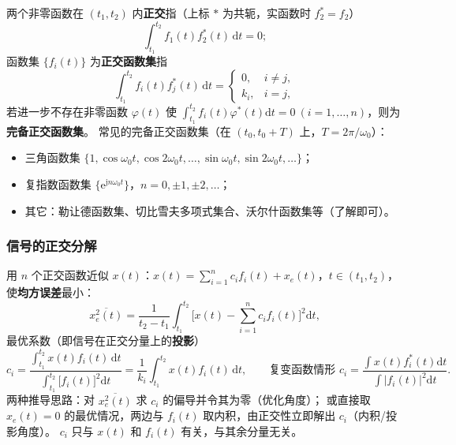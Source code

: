 两个非零函数在 $(t_1,t_2)$ 内\textbf{正交}指（上标 $*$ 为共轭，实函数时 $f_2^*=f_2$）
\begin{equation}
\int_{t_1}^{t_2}f_1(t)f_2^{*}(t)\,\mathrm{d}t=0;
\end{equation}
函数集 $\{f_i(t)\}$ 为\textbf{正交函数集}指
\begin{equation}
\int_{t_1}^{t_2}f_i(t)f_j^{*}(t)\,\mathrm{d}t=
\begin{cases}
0, & i\neq j,\\
k_i, & i=j,
\end{cases}
\end{equation}
若进一步不存在非零函数 $\varphi(t)$ 使
$\displaystyle\int_{t_1}^{t_2}f_i(t)\varphi^{*}(t)\mathrm{d}t=0\ (i=1,\dots,n)$，则为\textbf{完备正交函数集}。
常见的完备正交函数集（在 $(t_0,t_0+T)$ 上，$T=2\pi/\omega_0$）：
\begin{itemize}
\item 三角函数集 $\big\{1,\cos\omega_0t,\cos2\omega_0t,\dots,\sin\omega_0t,\sin2\omega_0t,\dots\big\}$；
\item 复指数函数集 $\big\{\mathrm{e}^{\mathrm{j}n\omega_0t}\big\}$，$n=0,\pm1,\pm2,\dots$；
\item 其它：勒让德函数集、切比雪夫多项式集合、沃尔什函数集等（了解即可）。
\end{itemize}

\subsubsection{信号的正交分解}

用 $n$ 个正交函数近似 $x(t)$：$x(t)=\sum_{i=1}^{n}c_if_i(t)+x_e(t)$，$t\in(t_1,t_2)$，
使\textbf{均方误差}最小：
\begin{equation}
\overline{x_e^2(t)}=\frac{1}{t_2-t_1}\int_{t_1}^{t_2}
\Big[x(t)-\sum_{i=1}^{n}c_if_i(t)\Big]^2\mathrm{d}t,
\end{equation}
最优系数（即信号在正交分量上的\textbf{投影}）
\begin{equation}
c_i=\frac{\displaystyle\int_{t_1}^{t_2}x(t)f_i(t)\,\mathrm{d}t}
{\displaystyle\int_{t_1}^{t_2}\big[f_i(t)\big]^2\mathrm{d}t}
=\frac{1}{k_i}\int_{t_1}^{t_2}x(t)f_i(t)\,\mathrm{d}t,
\qquad
\text{复变函数情形 }c_i=\frac{\int x(t)f_i^{*}(t)\mathrm{d}t}{\int\big|f_i(t)\big|^2\mathrm{d}t}.
\end{equation}
两种推导思路：对 $\overline{x_e^2(t)}$ 求 $c_i$ 的偏导并令其为零（优化角度）；
或直接取 $x_e(t)=0$ 的最优情况，两边与 $f_i(t)$ 取内积，由正交性立即解出 $c_i$（内积/投影角度）。
$c_i$ 只与 $x(t)$ 和 $f_i(t)$ 有关，与其余分量无关。

